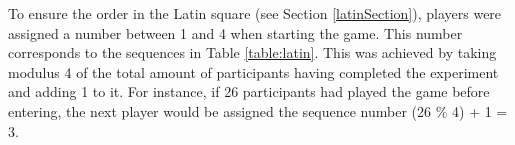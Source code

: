 To ensure the order in the Latin square (see Section \ref{latinSection}), players were assigned a number between 1 and 4 when starting the game. This number corresponds to the sequences in Table \ref{table:latin}. This was achieved by taking modulus 4 of the total amount of participants having completed the experiment and adding 1 to it. For instance, if 26 participants had played the game before entering, the next player would be assigned the sequence number (26 \% 4) + 1 = 3.